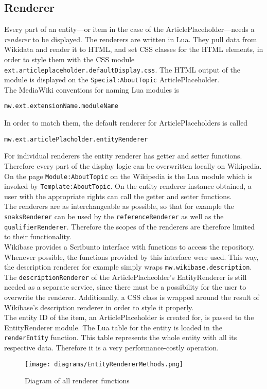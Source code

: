 \subsection{Renderer}

Every part of an entity---or item in the case of the ArticlePlaceholder---needs a \textit{renderer} to be displayed. The renderers are written in Lua. They pull data from Wikidata and render it to HTML, and set CSS classes for the HTML elements, in order to style them with the CSS module \texttt{\justify ext.articleplaceholder.defaultDisplay.css}. The HTML output of the module is displayed on the \texttt{\justify Special:AboutTopic} ArticlePlaceholder. \\
The MediaWiki conventions for naming Lua modules is 
\begin{center}
\texttt{\justify mw.ext.extensionName.moduleName} 
\end{center}
In order to match them, the default renderer for ArticlePlaceholders is called 
\begin{center}
\texttt{\justify mw.ext.articlePlacholder.entityRenderer}
\end{center}
For individual renderers the entity renderer has getter and setter functions. Therefore every part of the display logic can be overwritten locally on Wikipedia. \\
On the page \texttt{\justify Module:AboutTopic} on the Wikipedia is the Lua module which is invoked by \texttt{\justify Template:AboutTopic}. On the entity renderer instance obtained, a user with the appropriate rights can call the getter and setter functions. \\
The renderers are as interchangeable as possible, so that for example the \texttt{\justify snaksRenderer} can be used by the \texttt{\justify referenceRenderer} as well as the \texttt{\justify qualifierRenderer}. Therefore the scopes of the renderers are therefore limited to their functionality. \\
Wikibase provides a Scribunto interface with functions to access the repository. Whenever possible, the functions provided by this interface were used. This way, the description renderer for example simply wraps \texttt{\justify mw.wikibase.description}. The \texttt{\justify descriptionRenderer} of the ArticlePlacheolder's EntityRenderer is still needed as a separate service, since there must be a possibility for the user to overwrite the renderer. Additionally, a CSS class is wrapped around the result of Wikibase's description renderer in order to style it properly. \\
The entity ID of the item, an ArticlePlaceholder is created for, is passed to the EntityRenderer module. The Lua table for the entity is loaded in the \texttt{\justify renderEntity} function. This table represents the whole entity with all its respective data. Therefore it is a very performance-costly operation. \\

\begin{figure}[H]
	\centering
	\texttt{[image: diagrams/EntityRendererMethods.png]}
	\caption{Diagram of all renderer functions}
	\label{fig:renderer}
\end{figure}